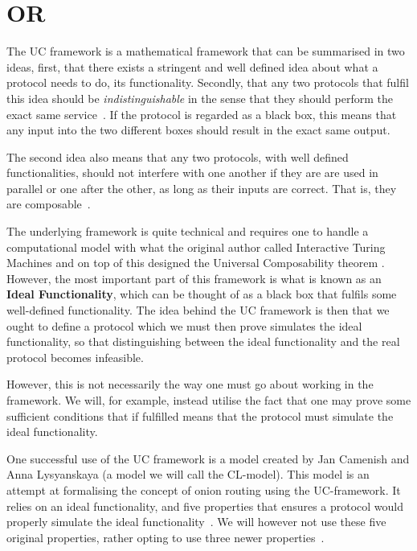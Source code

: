 \section{ \acl*{OR}}%
\label{UCOR}
The \ac{UC} framework is a mathematical framework that can be summarised in
two ideas, first, that there exists a stringent and well defined idea
about what a protocol needs to do, its functionality. Secondly, that
any two protocols that fulfil this idea should be {\it
  indistinguishable\/} in the sense that they should perform the exact
same service~\cite{UniversalComposability}. If the protocol is regarded as a black box, this means
that any input into the two different boxes should result in the
exact same output.

The second idea also means that any two protocols, with well defined
functionalities, should not interfere with one another if they are
are used in parallel or one after the other, as long as their inputs
are correct. That is, they are composable~\cite{UniversalComposability}.

The underlying framework is quite technical and requires one to handle
a computational model with what the original author %
called Interactive Turing Machines and on top of this designed the
Universal Composability theorem \cite{UniversalComposability}. However, the most important part of
this framework is what is known as an {\bf Ideal Functionality}, which
can be thought of as a black box that fulfils some well-defined
functionality\cite{UniversalComposability}. The idea behind the \ac{UC} framework is then that we ought
to define a protocol which we must then prove simulates the ideal
functionality, so that distinguishing between the ideal functionality
and the real protocol becomes infeasible.

However, this is not necessarily the way one must go about working in
the framework. We will, for example, instead utilise the fact that one
may prove some sufficient conditions that if fulfilled means that the
protocol must simulate the ideal functionality.

One  successful use of the \ac{UC} framework is a model
created by Jan Camenish and Anna Lysyanskaya (a model we will call the
CL-model). This model is an attempt at formalising the concept of
onion routing using the UC-framework. It relies on an ideal
functionality, and five properties that ensures a protocol would properly
simulate the ideal functionality~\cite{CL-model}. We will however not
use these five original properties, rather opting to use three newer
properties~\cite{kuhn}.

